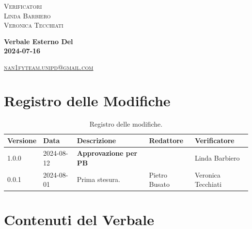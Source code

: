 \documentclass[8pt]{article}
\begin{document}
\begin{titlepage}
\begin{minipage}[t]{0.47\textwidth}
		{\large{\textsc{Verificatori}}
			\vspace{3mm}
			{\\\large{\textsc{Linda Barbiero}\\}} %
			{\large{\textsc{Veronica Tecchiati}}}
			
		}
		\vspace{4mm}\vspace{4mm}
	\end{minipage}
	\vspace{4cm}
	\begin{center}
		\begin{flushright}
			{\fontsize{30pt}{52pt}\selectfont \textbf{Verbale Esterno Del\\2024-07-16\\}} %
		\end{flushright}
		\vspace{3cm}
	\end{center}
	\vspace{8.5 cm}
	{\small \textsc{\href{mailto: nan1fyteam.unipd@gmail.com}{nan1fyteam.unipd@gmail.com}}}
\end{titlepage}
\pagestyle{mystyle}
\section*{Registro delle Modifiche}
\begin{table}[ht!]	
	\centering
	\begin{tabular}{p{1.2cm} p{2cm} p{5cm} p{3cm} p{3cm}}
		\toprule
		\textbf{Versione}& \textbf{Data} & \textbf{Descrizione} & \textbf{Redattore} & \textbf{Verificatore} \\
		\midrule
		1.0.0 & 2024-08-12 & \textbf{Approvazione per PB} & & Linda Barbiero \\
		0.0.1 & 2024-08-01 & Prima stesura. & Pietro Busato & Veronica Tecchiati \\
		\bottomrule
	\end{tabular}
	\caption{Registro delle modifiche.}
	\label{table:Registro delle modifiche}
\end{table}
\newpage
\tableofcontents
\clearpage
\newpage
\justifying
\section{Contenuti del Verbale}
\end{document}
